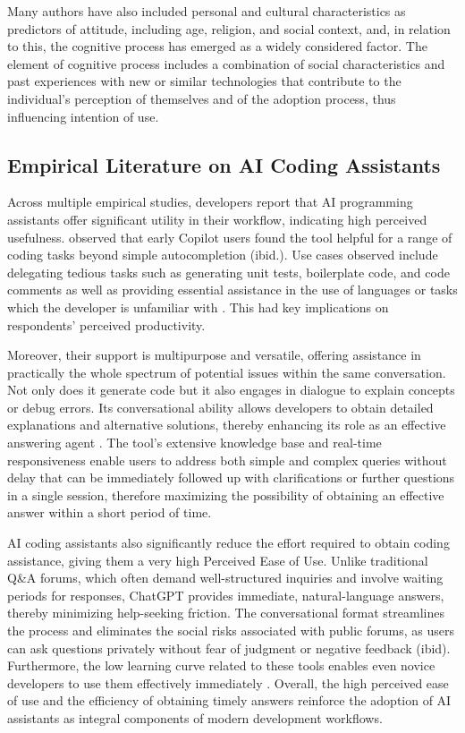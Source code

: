 Many authors have also included personal and cultural characteristics as predictors of attitude, including age, religion, and social context, and, in relation to this, the cognitive process has emerged as a widely considered factor. The element of cognitive process includes a combination of social characteristics and past experiences with new or similar technologies that contribute to the individual's perception of themselves and of the adoption process, thus influencing intention of use. 

\subsection{Empirical Literature on AI Coding Assistants}

Across multiple empirical studies, developers report that AI programming assistants offer significant utility in their workflow, indicating high perceived usefulness. \textcite{bird_taking_2023} observed that early Copilot users found the tool helpful for a range of coding tasks beyond simple autocompletion (ibid.). Use cases observed include delegating tedious tasks such as generating unit tests, boilerplate code, and code comments as well as providing essential assistance in the use of languages or tasks which the developer is unfamiliar with \parencite{bird_taking_2023, sergeyuk_using_2025}. This had key implications on respondents' perceived productivity.

Moreover, their support is multipurpose and versatile, offering assistance in practically the whole spectrum of potential issues within the same conversation. Not only does it generate code but it also engages in dialogue to explain concepts or debug errors. Its conversational ability allows developers to obtain detailed explanations and alternative solutions, thereby enhancing its role as an effective answering agent \parencite{kabir_is_2023}. The tool’s extensive knowledge base and real-time responsiveness enable users to address both simple and complex queries without delay that can be immediately followed up with clarifications or further questions in a single session, therefore maximizing the possibility of obtaining an effective answer within a short period of time.

AI coding assistants also significantly reduce the effort required to obtain coding assistance, giving them a very high Perceived Ease of Use. Unlike traditional Q\&A forums, which often demand well-structured inquiries and involve waiting periods for responses, ChatGPT provides immediate, natural-language answers, thereby minimizing help-seeking friction. The conversational format streamlines the process and eliminates the social risks associated with public forums, as users can ask questions privately without fear of judgment or negative feedback (ibid). Furthermore, the low learning curve related to these tools enables even novice developers to use them effectively immediately \parencite{bird_taking_2023}. Overall, the high perceived ease of use and the efficiency of obtaining timely answers reinforce the adoption of AI assistants as integral components of modern development workflows.


